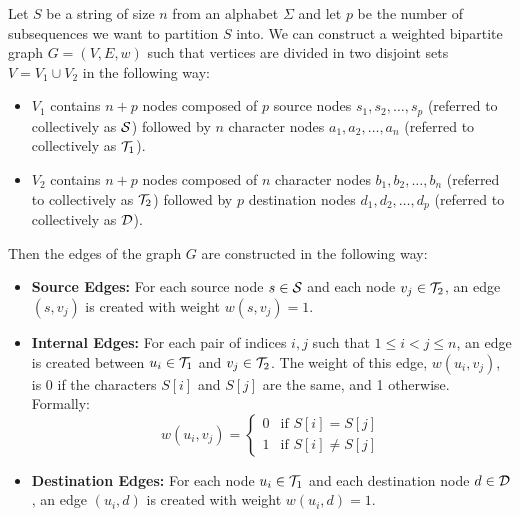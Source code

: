 \begin{definition} \label{def:bip_construction}
    Let $S$ be a string of size $n$ from an alphabet $\Sigma$ and let $p$ be the number of subsequences we want to partition $S$ into. 
    We can construct a weighted bipartite graph $G = (V,E,w)$ such that vertices are divided in two disjoint sets $V = V_1 \cup V_2$ in the following way:
    \begin{itemize}[leftmargin=25pt]
        \item $V_1$ contains $n+p$ nodes composed of $p$ source nodes $s_1,s_2,\dots,s_p$ (referred to collectively as $\mathcal{S}$) followed by $n$ character nodes $a_1,a_2,\dots,a_n$ (referred to collectively as $\mathcal{T}_{1}$).
        \item $V_2$ contains $n+p$ nodes composed of $n$ character nodes $b_1,b_2,\dots,b_n$ (referred to collectively as $\mathcal{T}_{2}$) followed by $p$ destination nodes $d_1,d_2,\dots,d_p$ (referred to collectively as $\mathcal{D}$).
    \end{itemize}
    Then the edges of the graph $G$ are constructed in the following way:
    \begin{itemize}[leftmargin=25pt]
        \item \textbf{Source Edges:} For each source node $s \in \mathcal{S}$ and each node $v_j \in \mathcal{T}_{2}$, an edge $(s, v_j)$ is created with weight $w(s, v_j) = 1$. 

        \item \textbf{Internal Edges:} For each pair of indices $i, j$ such that $1 \le i < j \le n$, an edge is created between $u_i \in \mathcal{T}_{1}$ and $v_j \in \mathcal{T}_{2}$. The weight of this edge, $w(u_i, v_j)$, is 0 if the characters $S[i]$ and $S[j]$ are the same, and 1 otherwise. Formally:
        \[ w(u_i, v_j) = 
            \begin{cases} 
                0 & \text{if } S[i] = S[j] \\
                1 & \text{if } S[i] \neq S[j] 
            \end{cases}
        \]

        \item \textbf{Destination Edges:} For each node $u_i \in \mathcal{T}_{1}$ and each destination node $d \in \mathcal{D}$, an edge $(u_i, d)$ is created with weight $w(u_i, d) = 1$.
    \end{itemize}
\end{definition}

